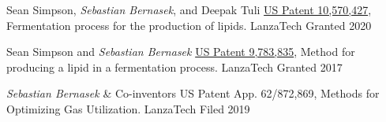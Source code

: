 

\begin{cventries}

      
  \cventrypub
    {Sean Simpson, \emph{Sebastian Bernasek}, and Deepak Tuli}
    {\href{https://patents.google.com/patent/US10570427B2/en}{US Patent 10,570,427}, Fermentation process for the production of lipids.}
    {LanzaTech}
    {Granted 2020}   
  
  \cventrypub
    {Sean Simpson and \emph{Sebastian Bernasek}}
    {\href{https://patents.google.com/patent/US9783835B2/en}{US Patent 9,783,835}, Method for producing a lipid in a fermentation process.}
    {LanzaTech}
    {Granted 2017}
    
  \cventrypub
    {\emph{Sebastian Bernasek} \& Co-inventors}
    {US Patent App. 62/872,869, Methods for Optimizing Gas Utilization.}
    {LanzaTech}
    {Filed 2019}  
    
    
\end{cventries}

